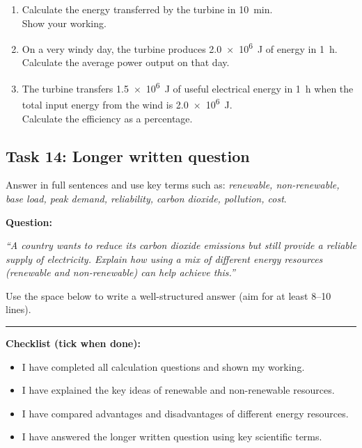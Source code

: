 \documentclass[11pt,a4paper]{article}
\begin{document}
\begin{enumerate}[label=\arabic*)]
    \item Calculate the energy transferred by the turbine in \SI{10}{\minute}. \\
    Show your working.
    \vspace{3cm}

    \item On a very windy day, the turbine produces \SI{2.0e6}{\joule} of energy in \SI{1}{\hour}. \\
    Calculate the average power output on that day.
    \vspace{3cm}

    \item The turbine transfers \SI{1.5e6}{\joule} of useful electrical energy in \SI{1}{\hour} when the total input energy from the wind is \SI{2.0e6}{\joule}. \\
    Calculate the efficiency as a percentage.
    \vspace{3cm}
\end{enumerate}

\newpage

\subsection*{Task 14: Longer written question}

Answer in full sentences and use key terms such as: \emph{renewable, non-renewable, base load, peak demand, reliability, carbon dioxide, pollution, cost}.

\textbf{Question:}

\emph{``A country wants to reduce its carbon dioxide emissions but still provide a reliable supply of electricity. Explain how using a mix of different energy resources (renewable and non-renewable) can help achieve this.''}

Use the space below to write a well-structured answer (aim for at least 8--10 lines).

\vspace{9cm}

\hrule
\vspace{0.3cm}

\textbf{Checklist (tick when done):}

\begin{itemize}[noitemsep]
    \item[$\square$] I have completed all calculation questions and shown my working.
    \item[$\square$] I have explained the key ideas of renewable and non-renewable resources.
    \item[$\square$] I have compared advantages and disadvantages of different energy resources.
    \item[$\square$] I have answered the longer written question using key scientific terms.
\end{itemize}

\vfill
\end{document}
